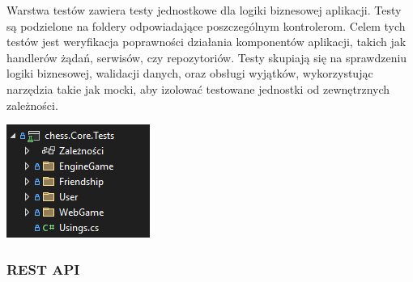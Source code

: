 \documentclass[12pt,a4paper]{article}
\begin{document}
\vspace{0.5cm}
\begin{minipage}[t]{0.45\textwidth}
    \vspace{0pt}
    \justifying 
    \noindent
    Warstwa testów zawiera testy jednostkowe dla logiki biznesowej aplikacji. Testy są podzielone na foldery odpowiadające poszczególnym kontrolerom. Celem tych testów jest weryfikacja poprawności działania komponentów aplikacji, takich jak handlerów żądań, serwisów, czy repozytoriów. Testy skupiają się na sprawdzeniu logiki biznesowej, walidacji danych, oraz obsługi wyjątków, wykorzystując narzędzia takie jak mocki, aby izolować testowane jednostki od zewnętrznych zależności.
\end{minipage}
\hfill
\begin{minipage}[t]{0.45\textwidth}
    \vspace{0pt}
    \centering
    \includegraphics[width=\linewidth]{images/struktura_back_core_tests.png} 
\end{minipage}

\newpage

\subsubsection{REST API}
\end{document}
